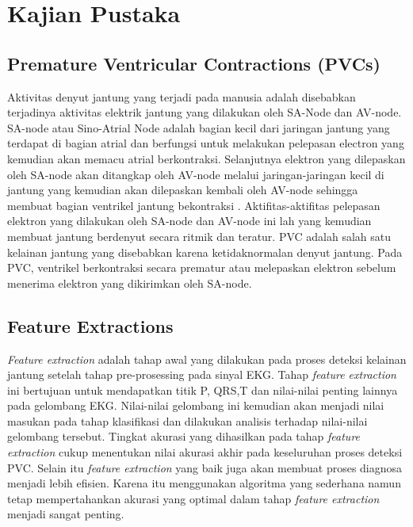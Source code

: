 \chapter{Kajian Pustaka}

\section{Premature Ventricular Contractions (PVCs)}
Aktivitas denyut jantung yang terjadi pada manusia adalah disebabkan terjadinya aktivitas elektrik jantung yang dilakukan oleh SA-Node dan AV-node\cite{heart_act}. SA-node atau Sino-Atrial Node adalah bagian kecil dari jaringan jantung yang terdapat di bagian atrial dan berfungsi untuk melakukan pelepasan electron yang kemudian akan memacu atrial berkontraksi. Selanjutnya elektron yang dilepaskan oleh SA-node akan ditangkap oleh AV-node melalui jaringan-jaringan kecil di jantung yang kemudian akan dilepaskan kembali oleh AV-node sehingga membuat bagian ventrikel jantung bekontraksi \cite{khandait2012}. Aktifitas-aktifitas pelepasan elektron yang dilakukan oleh SA-node dan AV-node ini lah yang kemudian membuat jantung berdenyut secara ritmik dan teratur. PVC adalah salah satu kelainan jantung yang disebabkan karena ketidaknormalan denyut jantung. Pada PVC, ventrikel berkontraksi secara prematur atau melepaskan elektron sebelum menerima elektron yang dikirimkan oleh SA-node\cite{Kanwar2015}.

\section{Feature Extractions}
\textit{Feature extraction} adalah tahap awal yang dilakukan pada proses deteksi kelainan jantung setelah tahap pre-prosessing pada sinyal EKG. Tahap \textit{feature extraction} ini bertujuan untuk mendapatkan titik P, QRS,T dan nilai-nilai penting lainnya pada gelombang EKG. Nilai-nilai gelombang ini kemudian akan menjadi nilai masukan pada tahap klasifikasi dan dilakukan analisis terhadap nilai-nilai gelombang tersebut. Tingkat akurasi yang dihasilkan pada tahap \textit{feature extraction} cukup menentukan nilai akurasi akhir pada keseluruhan proses deteksi PVC\cite{Huang2015Thesis}. Selain itu \textit{feature extraction} yang baik juga akan membuat proses diagnosa menjadi lebih efisien\cite{Karpagachelvi2010,Chang1987,UMaji}. Karena itu menggunakan algoritma yang sederhana namun tetap mempertahankan akurasi yang optimal dalam tahap \textit{feature extraction} menjadi sangat penting.

